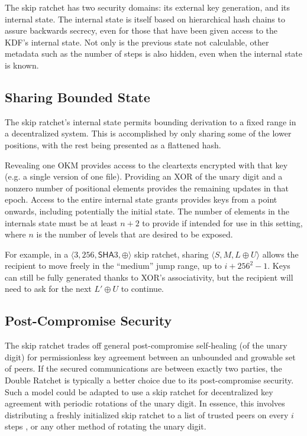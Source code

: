 \documentclass[twocolumn]{article}
\begin{document}
	The skip ratchet has two security domains: its external key generation, and its internal state. The internal state is itself based on hierarchical hash chains to assure backwards secrecy, even for those that have been given access to the KDF's internal state. Not only is the previous state not calculable, other metadata such as the number of steps is also hidden, even when the internal state is known.
	
	\subsection{Sharing Bounded State}
	
	The skip ratchet's internal state permits bounding derivation to a fixed range in a decentralized system. This is accomplished by only sharing some of the lower positions, with the rest being presented as a flattened hash.
	
	Revealing one OKM provides access to the cleartexts encrypted with that key (e.g. a single version of one file). Providing an \textsf{XOR} of the unary digit and a nonzero number of positional elements provides the remaining updates in that epoch. Access to the entire internal state grants provides keys from a point onwards, including potentially the initial state. The number of elements in the internals state must be at least $n+2$ to provide if intended for use in this setting, where $n$ is the number of levels that are desired to be exposed.
	
	For example, in a $\langle 3, 256, \textsf{SHA}3, \oplus \rangle$ skip ratchet, sharing $\langle S, M, L \oplus U \rangle$ allows the recipient to move freely in the ``medium'' jump range, up to $i + 256^{2} - 1$. Keys can still be fully generated thanks to \textsf{XOR}'s associativity, but the recipient will need to ask for the next $L' \oplus U$ to continue.
	
	\subsection{Post-Compromise Security}
	
	The skip ratchet trades off general post-compromise self-healing (of the unary digit) for permissionless key agreement between an unbounded and growable set of peers. If the secured communications are between exactly two parties, the Double Ratchet is typically a better choice due to its post-compromise security. Such a model could be adapted to use a skip ratchet for decentralized key agreement with periodic rotations of the unary digit. In essence, this involves distributing a freshly initialized skip ratchet to a list of trusted peers on every $i$ steps \cite{decentralized-key-agreement}, or any other method of rotating the unary digit.
	
\end{document}
